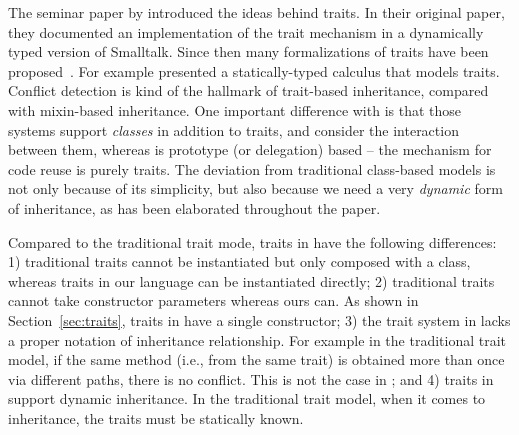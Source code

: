 The seminar paper by \citet{scharli2003traits} introduced the ideas behind
traits. In their original paper, they documented an implementation of the trait
mechanism in a dynamically typed version of Smalltalk. Since then many
formalizations of traits have been
proposed~\cite{scharli2003traitsformal,ducasse2006traits,bettini2010prototypical}.
For example \citet{fisher2004typed} presented a statically-typed calculus that
models traits. Conflict detection is kind of the hallmark of trait-based
inheritance, compared with mixin-based inheritance. One important difference
with \name is that those systems support \textit{classes} in addition to traits,
and consider the interaction between them, whereas \name is prototype (or
delegation) based -- the mechanism for code reuse is purely traits. The
deviation from traditional class-based models is not only because of its
simplicity, but also because we need a very \textit{dynamic} form of
inheritance, as has been elaborated throughout the paper.

Compared to the traditional trait mode, traits in \name have the following
differences: 1) traditional traits cannot be instantiated but only composed with
a class, whereas traits in our language can be instantiated directly; 2)
traditional traits cannot take constructor parameters whereas ours can. As shown
in Section~\ref{sec:traits}, traits in \name have a single constructor; 3) the
trait system in \name lacks a proper notation of inheritance relationship. For
example in the traditional trait model, if the same method (i.e., from the same
trait) is obtained more than once via different paths, there is no conflict.
This is not the case in \name; and 4) traits in \name support dynamic
inheritance. In the traditional trait model, when it comes to inheritance, the
traits must be statically known.





